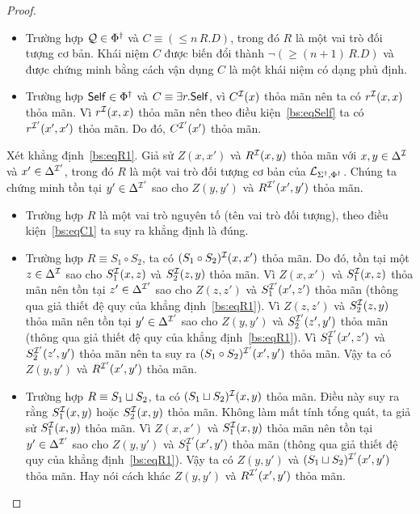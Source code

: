 \begin{proof}
\begin{itemize}
		\item Trường hợp $\mathcal{Q} \in \Phi^\dag$ và $C \equiv (\leq\!n\,R.D)$, trong đó $R$ là một vai trò đối tượng cơ bản. Khái niệm $C$ được biến đổi thành $\neg (\geq\!(n+1)\,R.D)$ và được chứng minh bằng cách vận dụng $C$ là một khái niệm có dạng phủ định.
		
		\item Trường hợp $\mathsf{Self} \in \Phi^\dag$ và $C \equiv \exists r.\mathsf{Self}$, vì $C^{\mathcal{I}}(x)$ thỏa mãn nên ta có $r^{\mathcal{I}}(x,x)$ thỏa mãn. Vì $r^{\mathcal{I}}(x,x)$ thỏa mãn nên theo điều kiện~\eqref{bs:eqSelf} ta có $r^{\mathcal{I}'}(x',x')$ thỏa mãn. Do đó, $C^{\mathcal{I}'}(x')$ thỏa mãn.
	\end{itemize}
	
	\semiItem Xét khẳng định~\eqref{bs:eqR1}. Giả sử $Z(x,x')$ và $R^{\mathcal{I}}(x,y)$ thỏa mãn với $x, y \in \Delta^{\mathcal{I}}$ và $x' \in \Delta^{\mathcal{I}'}$, trong đó $R$ là một vai trò đối tượng cơ bản của $\mathcal{L}_{\Sigma^\dag,\Phi^\dag}$. Chúng ta chứng minh tồn tại $y' \in \Delta^{\mathcal{I}'}$ sao cho $Z(y,y')$ và $R^{\mathcal{I}'}(x',y')$ thỏa mãn.
	\begin{itemize}
		\item Trường hợp $R$ là một vai trò nguyên tố (tên vai trò đối tượng), theo điều kiện~\eqref{bs:eqC1} ta suy ra khẳng định là đúng.
		
		\item Trường hợp $R \equiv S_1 \circ S_2$, ta có $(S_1 \circ S_2)^{\mathcal{I}}(x,x')$ thỏa mãn. Do đó, tồn tại một $z \in \Delta^{\mathcal{I}}$ sao cho $S_1^{\mathcal{I}}(x,z)$ và $S_2^{\mathcal{I}}(z,y)$ thỏa mãn. Vì $Z(x,x')$ và $S_1^{\mathcal{I}}(x,z)$ thỏa mãn nên tồn tại $z' \in \Delta^{\mathcal{I}'}$ sao cho $Z(z,z')$ và $S_1^{\mathcal{I}'}(x',z')$ thỏa mãn (thông qua giả thiết đệ quy của khẳng định~\eqref{bs:eqR1}). Vì $Z(z,z')$ và $S_2^{\mathcal{I}}(z,y)$ thỏa mãn nên tồn tại $y' \in \Delta^{\mathcal{I}'}$ sao cho $Z(y,y')$ và $S_2^{\mathcal{I}'}(z',y')$ thỏa mãn (thông qua giả thiết đệ quy của khẳng định~\eqref{bs:eqR1}). Vì $S_1^{\mathcal{I}'}(x',z')$ và $S_2^{\mathcal{I}'}(z',y')$ thỏa mãn nên ta suy ra $(S_1 \circ S_2)^{\mathcal{I}'}(x',y')$ thỏa mãn. Vậy ta có $Z(y,y')$ và $R^{\mathcal{I}'}(x',y')$ thỏa mãn.
		
		\item Trường hợp $R \equiv S_1 \sqcup S_2$, ta có $(S_1 \sqcup S_2)^{\mathcal{I}}(x,y)$ thỏa mãn. Điều này suy ra rằng $S_1^{\mathcal{I}}(x,y)$ hoặc $S_2^{\mathcal{I}}(x,y)$ thỏa mãn. Không làm mất tính tổng quát, ta giả sử $S_1^{\mathcal{I}}(x,y)$ thỏa mãn. Vì $Z(x,x')$ và $S_1^{\mathcal{I}}(x,y)$ thỏa mãn nên tồn tại $y' \in \Delta^{\mathcal{I}'}$ sao cho $Z(y,y')$ và $S_1^{\mathcal{I}'}(x',y')$ thỏa mãn (thông qua giả thiết đệ quy của khẳng định~\eqref{bs:eqR1}). Vậy ta có $Z(y,y')$ và $(S_1 \sqcup S_2)^{\mathcal{I}'}(x',y')$ thỏa mãn. Hay nói cách khác $Z(y,y')$ và $R^{\mathcal{I}'}(x',y')$ thỏa mãn.
		

\end{itemize}
\end{proof}

